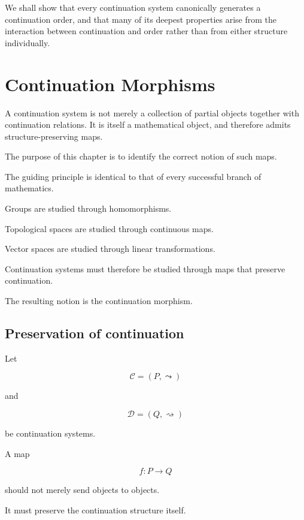 \documentclass[13pt,openany]{book}
\theoremstyle{plain}
\theoremstyle{definition}
\begin{document}
We shall show that every continuation system canonically generates a
continuation order, and that many of its deepest properties arise from the
interaction between continuation and order rather than from either
structure individually.

\chapter{Continuation Morphisms}

A continuation system is not merely a collection of partial objects together
with continuation relations. It is itself a mathematical object, and therefore
admits structure-preserving maps.

The purpose of this chapter is to identify the correct notion of such maps.

The guiding principle is identical to that of every successful branch of
mathematics.

Groups are studied through homomorphisms.

Topological spaces are studied through continuous maps.

Vector spaces are studied through linear transformations.

Continuation systems must therefore be studied through maps that preserve
continuation.

The resulting notion is the continuation morphism.


\section{Preservation of continuation}

Let

\[
\mathcal C=(P,\leadsto)
\]

and

\[
\mathcal D=(Q,\rightsquigarrow)
\]

be continuation systems.

A map

\[
f:P\rightarrow Q
\]

should not merely send objects to objects.

It must preserve the continuation structure itself.

\end{document}
